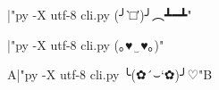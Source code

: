\documentclass{article}
\begin{document}
\def\kaomoji#1{{|"py -X utf-8 cli.py #1"\relax}}
\kaomoji{(╯‵□′)╯︵┻━┻}\par
\kaomoji{(｡♥‿♥｡)}\par
\vskip20pt\Huge
A\kaomoji{╰(✿´⌣`✿)╯♡}B
\end{document}
